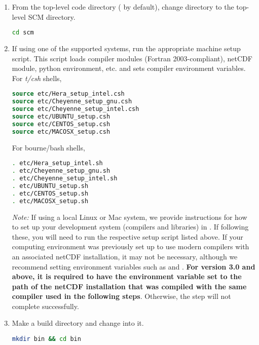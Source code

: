\begin{enumerate}
 \item From the top-level code directory ( by default), change directory to the top-level SCM directory.
\begin{lstlisting}[language=bash]
cd scm
\end{lstlisting}
\item If using one of the supported systems, run the appropriate machine setup script. This script loads compiler modules (Fortran 2003-compliant), netCDF module, python environment, etc. and sets compiler environment variables. For \textit{t/csh} shells,
\begin{lstlisting}[language=csh]
source etc/Hera_setup_intel.csh
source etc/Cheyenne_setup_gnu.csh
source etc/Cheyenne_setup_intel.csh
source etc/UBUNTU_setup.csh
source etc/CENTOS_setup.csh
source etc/MACOSX_setup.csh
\end{lstlisting}
For bourne/bash shells,
\begin{lstlisting}[language=bash]
. etc/Hera_setup_intel.sh
. etc/Cheyenne_setup_gnu.sh
. etc/Cheyenne_setup_intel.sh
. etc/UBUNTU_setup.sh
. etc/CENTOS_setup.sh
. etc/MACOSX_setup.sh
\end{lstlisting}
\emph{Note:} If using a local Linux or Mac system, we provide instructions for how to set up your development system (compilers and libraries) in . If following these, you will need to run the respective setup script listed above. If your computing environment was previously set up to use modern compilers with an associated netCDF installation, it may not be necessary, although we recommend setting environment variables such as  and . \textbf{For version 3.0 and above, it is required to have the  environment variable set to the path of the netCDF installation that was compiled with the same compiler used in the following steps}. Otherwise, the  step will not complete successfully.

    \item Make a build directory and change into it.
\begin{lstlisting}[language=bash]
mkdir bin && cd bin
\end{lstlisting}


\end{enumerate}
